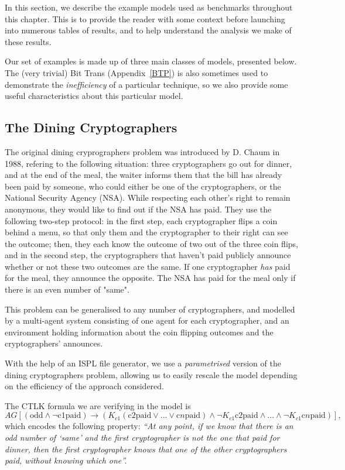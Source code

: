 \documentclass[11pt]{article}
\begin{document}
In this section, we describe the example models used as benchmarks throughout this chapter. This is to provide the reader with some context before launching into numerous tables of results, and to help understand the analysis we make of these results. 

Our set of examples is made up of three main classes of models, presented below. The (very trivial) Bit Trans (Appendix~\ref{BTP}) is also sometimes used to demonstrate the \textit{inefficiency} of a particular technique, so we also provide some useful characteristics about this particular model. 

\subsection*{The Dining Cryptographers}

The original dining cryprographers problem was introduced by D. Chaum in 1988, refering to the following situation: three cryptographers go out for dinner, and at the end of the meal, the waiter informs them that the bill has already been paid by someone, who could either be one of the cryptographers, or the National Security Agency (NSA). While respecting each other's right to remain anonymous, they would like to find out if the NSA has paid. They use the following two-step protocol: in the first step, each cryptographer flips a coin behind a menu, so that only them and the cryptographer to their right can see the outcome; then, they each know the outcome of two out of the three coin flips, and in the second step, the cryptographers that haven't paid publicly announce whether or not these two outcomes are the same. If one cryptographer \textit{has} paid for the meal, they announce the opposite. The NSA has paid for the meal only if there is an even number of "same". 

This problem can be generalised to any number of cryptographers, and modelled by a multi-agent system consisting of one agent for each cryptographer, and an environment holding information about the coin flipping outcomes and the cryptographers' announces.

With the help of an ISPL file generator, we use a \textit{parametrised} version of the dining cryptographers problem, allowing us to easily rescale the model depending on the efficiency of the approach considered. 

The CTLK formula we are verifying in the model is 
$$AG\left[(\mbox{odd} \land \lnot \mbox{c1paid}) \rightarrow (K_{c1} (\mbox{c2paid} \lor ... \lor \mbox{c$n$paid}) \land \lnot K_{c1} \mbox{c2paid} \land ...  \land \lnot K_{c1} \mbox{c$n$paid})\right],$$
which encodes the following property:
\textit{ ``At any point, if we know that there is an odd number of `same' and the first cryptographer is not the one that paid for dinner, then the first cryptographer knows that one of the other cryptographers paid, without knowing which one''.}
\end{document}
